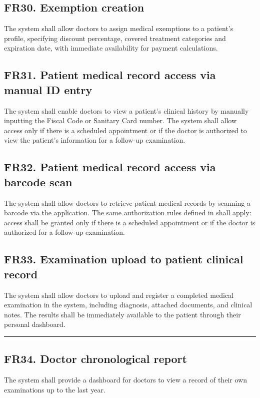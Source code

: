 \documentclass[12pt, a4paper]{article}
\begin{document}
\subsection{FR30. Exemption creation} \label{FR30}
The system shall allow doctors to assign medical exemptions to a patient's profile, specifying discount percentage, covered treatment categories and expiration date, with immediate availability for payment calculations.
\\ 

\subsection{FR31. Patient medical record access via manual ID entry} \label{FR31}
The system shall enable doctors to view a patient's clinical history by manually inputting the Fiscal Code or Sanitary Card number. The system shall allow access only if there is a scheduled appointment or if the doctor is authorized to view the patient's information for a follow-up examination.
\\ 

\subsection{FR32. Patient medical record access via barcode scan} \label{FR32}
The system shall allow doctors to retrieve patient medical records by scanning a barcode via the application. The same authorization rules defined in  shall apply: access shall be granted only if there is a scheduled appointment or if the doctor is authorized for a follow-up examination.
\\ 

\subsection{FR33. Examination upload to patient clinical record} \label{FR33}
The system shall allow doctors to upload and register a completed medical examination in the system, including diagnosis, attached documents, and clinical notes. The results shall be immediately available to the patient through their personal dashboard.
\\ 

\noindent\rule{\textwidth}{0.4pt}
\medskip

\subsection{FR34. Doctor chronological report} \label{FR34}
The system shall provide a dashboard for doctors to view a record of their own examinations up to the last year.
\\ 
\end{document}
